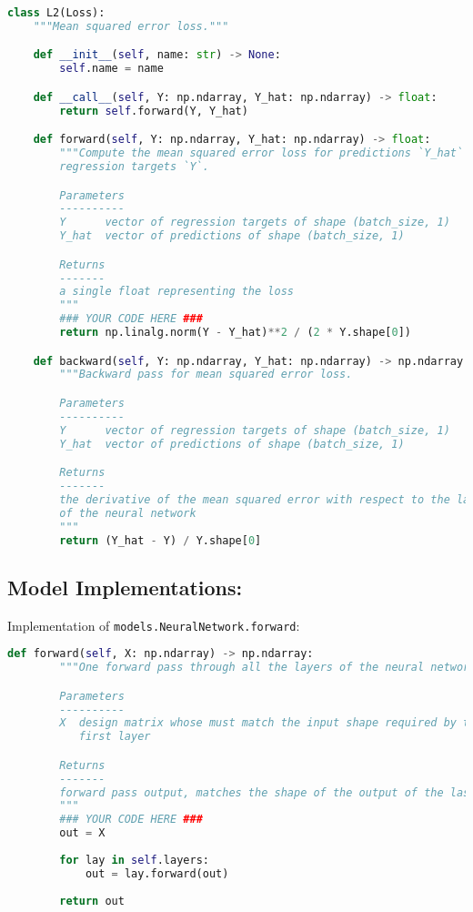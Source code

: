 \begin{lstlisting}[language=Python]
class L2(Loss):
    """Mean squared error loss."""

    def __init__(self, name: str) -> None:
        self.name = name

    def __call__(self, Y: np.ndarray, Y_hat: np.ndarray) -> float:
        return self.forward(Y, Y_hat)

    def forward(self, Y: np.ndarray, Y_hat: np.ndarray) -> float:
        """Compute the mean squared error loss for predictions `Y_hat` given
        regression targets `Y`.

        Parameters
        ----------
        Y      vector of regression targets of shape (batch_size, 1)
        Y_hat  vector of predictions of shape (batch_size, 1)

        Returns
        -------
        a single float representing the loss
        """
        ### YOUR CODE HERE ###
        return np.linalg.norm(Y - Y_hat)**2 / (2 * Y.shape[0])

    def backward(self, Y: np.ndarray, Y_hat: np.ndarray) -> np.ndarray:
        """Backward pass for mean squared error loss.

        Parameters
        ----------
        Y      vector of regression targets of shape (batch_size, 1)
        Y_hat  vector of predictions of shape (batch_size, 1)

        Returns
        -------
        the derivative of the mean squared error with respect to the last layer
        of the neural network
        """
        return (Y_hat - Y) / Y.shape[0]

\end{lstlisting}


\subsection{Model Implementations:}

Implementation of \texttt{models.NeuralNetwork.forward}:

\begin{lstlisting}[language=Python]
    def forward(self, X: np.ndarray) -> np.ndarray:
        """One forward pass through all the layers of the neural network.

        Parameters
        ----------
        X  design matrix whose must match the input shape required by the
           first layer

        Returns
        -------
        forward pass output, matches the shape of the output of the last layer
        """
        ### YOUR CODE HERE ###
        out = X
        
        for lay in self.layers:
            out = lay.forward(out)
        
        return out

\end{lstlisting}

